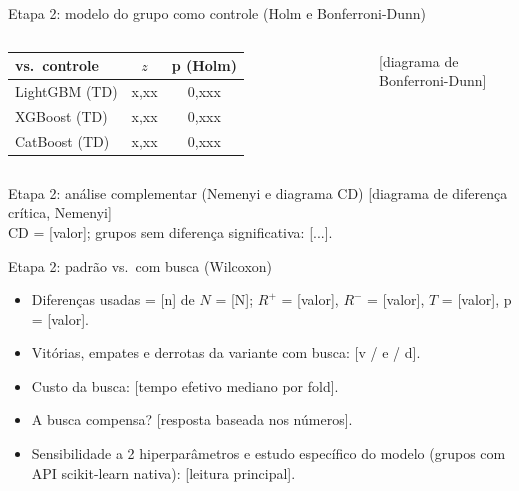 \documentclass[aspectratio=169,11pt]{beamer}
\begin{document}
\begin{frame}{Etapa 2: modelo do grupo como controle (Holm e Bonferroni-Dunn)}
    \begin{columns}[T,onlytextwidth]
        \footnotesize
        \begin{tabular}{l c c}
            \toprule
            \textbf{vs.\ controle} & \textbf{$z$} & \textbf{p (Holm)} \\
            \midrule
            LightGBM (TD) & x,xx & 0,xxx \\
            XGBoost (TD)  & x,xx & 0,xxx \\
            CatBoost (TD) & x,xx & 0,xxx \\
            \bottomrule
        \end{tabular}
        \centering
        [diagrama de Bonferroni-Dunn]
    \end{columns}
\end{frame}

\begin{frame}{Etapa 2: análise complementar (Nemenyi e diagrama CD)}
    \centering
    [diagrama de diferença crítica, Nemenyi]
    \\[0.4em]
    \footnotesize CD = [valor]; grupos sem diferença significativa: [...].
\end{frame}

\begin{frame}{Etapa 2: padrão vs.\ com busca (Wilcoxon)}
    \begin{itemize}
        \item Diferenças usadas = [n] de $N$ = [N]; $R^+$ = [valor], $R^-$ = [valor], $T$ = [valor], p = [valor].
        \item Vitórias, empates e derrotas da variante com busca: [v / e / d].
        \item Custo da busca: [tempo efetivo mediano por fold].
        \item A busca compensa? [resposta baseada nos números].
        \item Sensibilidade a 2 hiperparâmetros e estudo específico do modelo (grupos com API scikit-learn nativa): [leitura principal].
    \end{itemize}
\end{frame}
\end{document}
